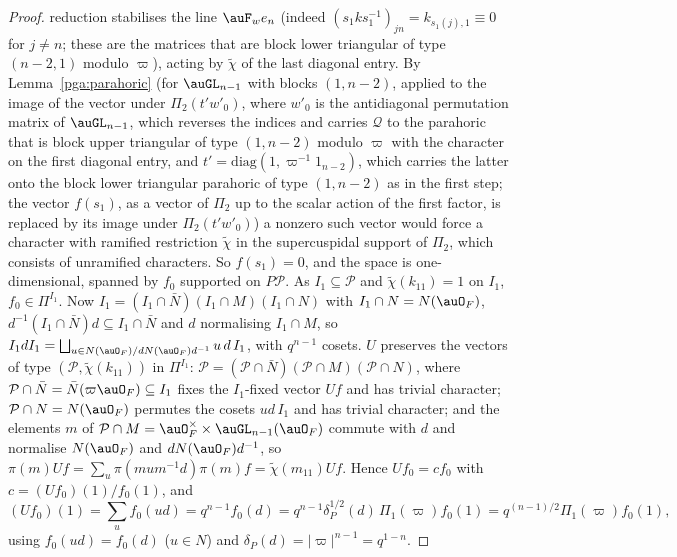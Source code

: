 \documentclass[10pt]{amsart}
\theoremstyle{definition}
\theoremstyle{remark}
\begin{document}
\begin{proof}
reduction stabilises the line $\auF_w e_n$ (indeed $(s_1ks_1^{-1})_{jn}=k_{s_1(j),1}\equiv0$ for
$j\neq n$; these are the matrices that are block lower triangular of type $(n-2,1)$ modulo $\varpi$),
acting by $\tilde\chi$ of the
last diagonal entry. By Lemma~\ref{pga:parahoric} (for $\auGL_{n-1}$ with blocks $(1,n-2)$, applied to the image of
the vector under $\Pi_2(t'w'_0)$, where $w'_0$ is the antidiagonal permutation matrix of $\auGL_{n-1}$,
which reverses the indices and carries $\mathcal Q$ to the parahoric that is block upper triangular of type
$(1,n-2)$ modulo $\varpi$ with the character on the first diagonal entry, and $t'=\mathrm{diag}(1,
\varpi^{-1}1_{n-2})$, which carries the latter onto the block lower triangular parahoric of type
$(1,n-2)$ as in the first step; the vector $f(s_1)$, as a vector of $\Pi_2$ up to the scalar action of
the first factor, is replaced by its image under $\Pi_2(t'w'_0)$) a nonzero such vector would force a character with ramified restriction $\tilde\chi$
in the supercuspidal support of $\Pi_2$, which consists of unramified characters. So $f(s_1)=0$, and
the space is one-dimensional, spanned by $f_0$ supported on $P\mathcal P$. As $I_1
\subseteq\mathcal P$ and $\tilde\chi(k_{11})=1$ on $I_1$, $f_0\in\Pi^{I_1}$. Now $I_1=(I_1\cap\bar N)
(I_1\cap M)(I_1\cap N)$ with $I_1\cap N=N(\auO_F)$, $d^{-1}(I_1\cap\bar N)d\subseteq I_1\cap\bar N$
and $d$ normalising $I_1\cap M$, so $I_1dI_1=\bigsqcup_{u\in N(\auO_F)/dN(\auO_F)d^{-1}}u\,d\,I_1$, with
$q^{n-1}$ cosets. $U$ preserves the vectors of type $(\mathcal P,\tilde\chi(k_{11}))$ in $\Pi^{I_1}$:
$\mathcal P=(\mathcal P\cap\bar N)(\mathcal P\cap M)(\mathcal P\cap N)$, where $\mathcal P\cap\bar N=
\bar N(\varpi\auO_F)\subseteq I_1$ fixes the $I_1$-fixed vector $Uf$ and has trivial character;
$\mathcal P\cap N=N(\auO_F)$ permutes the cosets $ud\,I_1$ and has trivial character; and the elements
$m$ of $\mathcal P\cap M=\auO_F^\times\times\auGL_{n-1}(\auO_F)$ commute with $d$ and normalise $N(\auO_F)$
and $dN(\auO_F)d^{-1}$, so $\pi(m)Uf=\sum_u\pi(mum^{-1}d)\pi(m)f=\tilde\chi(m_{11})Uf$. Hence
$Uf_0=cf_0$ with $c=(Uf_0)(1)/f_0(1)$, and
\[
(Uf_0)(1)=\sum_uf_0(ud)=q^{n-1}f_0(d)=q^{n-1}\delta_P^{1/2}(d)\,\Pi_1(\varpi)f_0(1)=
q^{(n-1)/2}\Pi_1(\varpi)f_0(1),
\]
using $f_0(ud)=f_0(d)$ ($u\in N$) and $\delta_P(d)=|\varpi|^{n-1}=q^{1-n}$.
\end{proof}
\end{document}

